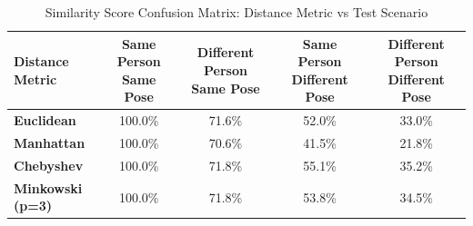 \begin{table}[htbp]
\centering
\caption{Similarity Score Confusion Matrix: Distance Metric vs Test Scenario}
\label{tab:confusion_matrix}
\begin{tabular}{lcccc}
\toprule
\textbf{Distance Metric} & \textbf{Same Person Same Pose} & \textbf{Different Person Same Pose} & \textbf{Same Person Different Pose} & \textbf{Different Person Different Pose} \\
\midrule
\textbf{Euclidean} & 100.0\% & 71.6\% & 52.0\% & 33.0\% \\
\textbf{Manhattan} & 100.0\% & 70.6\% & 41.5\% & 21.8\% \\
\textbf{Chebyshev} & 100.0\% & 71.8\% & 55.1\% & 35.2\% \\
\textbf{Minkowski (p=3)} & 100.0\% & 71.8\% & 53.8\% & 34.5\% \\
\bottomrule
\end{tabular}
\end{table}